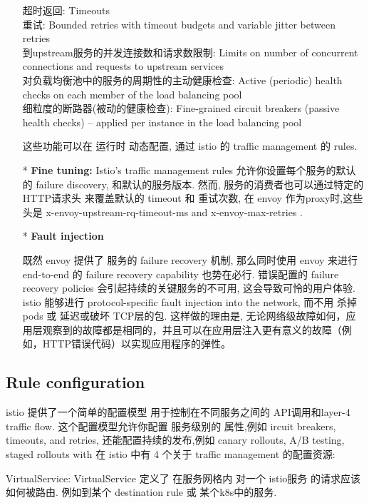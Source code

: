 \documentclass{ctexart}
\begin{document}
\begin{enumerate}
	超时返回: Timeouts\\
	重试: Bounded retries with timeout budgets and variable jitter between retries\\
	到upstream服务的并发连接数和请求数限制: Limits on number of concurrent connections and requests to upstream services\\
	对负载均衡池中的服务的周期性的主动健康检查: Active (periodic) health checks on each member of the load balancing pool\\
	细粒度的断路器(被动的健康检查): Fine-grained circuit breakers (passive health checks) – applied per instance in the load balancing pool
	
	这些功能可以在 运行时 动态配置, 通过 istio 的 traffic management 的 rules.
	
	\item [*] \textbf{Fine tuning:}
	Istio’s traffic management rules 允许你设置每个服务的默认的 failure discovery, 和默认的服务版本.
	然而, 服务的消费者也可以通过特定的HTTP请求头 来覆盖默认的 timeout 和 重试次数, 在 envoy 作为proxy时,这些头是 x-envoy-upstream-rq-timeout-ms and x-envoy-max-retries .
	
	\item [*] \textbf{Fault injection}

	既然 envoy 提供了 服务的 failure recovery 机制, 那么同时使用 envoy 来进行 end-to-end 的 failure recovery capability 也势在必行.
	错误配置的 failure recovery policies 会引起持续的关键服务的不可用, 这会导致可怜的用户体验.
	istio 能够进行 protocol-specific fault injection into the network, 而不用 杀掉 pods 或 延迟或破坏 TCP层的包.  这样做的理由是, 无论网络级故障如何，应用层观察到的故障都是相同的，并且可以在应用层注入更有意义的故障（例如，HTTP错误代码）以实现应用程序的弹性。
	


\end{enumerate}

\subsection{Rule configuration}
istio 提供了一个简单的配置模型 用于控制在不同服务之间的 API调用和layer-4 traffic flow.
这个配置模型允许你配置 服务级别的 属性,例如 ircuit breakers, timeouts, and retries, 还能配置持续的发布,例如 canary rollouts, A/B testing, staged rollouts with %
在 istio 中有 4 个关于 traffic management 的配置资源:

VirtualService: VirtualService 定义了 在服务网格内 对一个 istio服务 的请求应该如何被路由. 例如到某个 destination rule 或 某个k8s中的服务.
\end{document}
